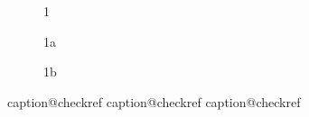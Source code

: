 \documentclass{article}
\begin{document}
\begin{figure}
\caption{1}\label{1}
\end{figure}

\begin{figure}
\continuedfloat
\caption{1a}\label{1a}
\end{figure}

\begin{figure}
\ContinuedFloat
\caption{1b}\label{1b}
\end{figure}

\csname caption@checkref
\csname caption@checkref
\csname caption@checkref
\end{document}
